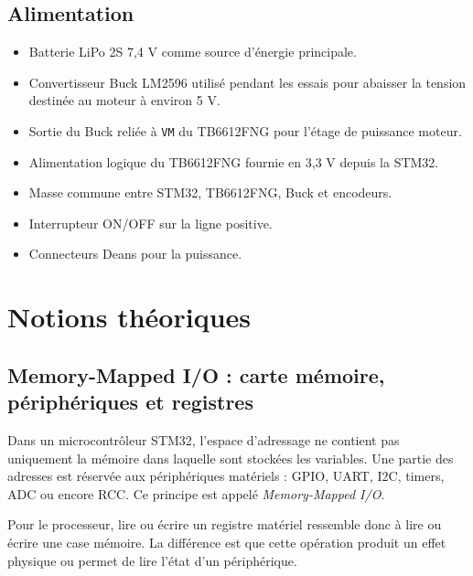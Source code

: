 \documentclass[11pt,a4paper]{article}
\begin{document}
	\subsection*{Alimentation}
	
	\begin{componentbox}
		\begin{itemize}
			\item Batterie LiPo 2S 7,4 V comme source d'énergie principale.
			\item Convertisseur Buck LM2596 utilisé pendant les essais pour abaisser la tension destinée au moteur à environ 5 V.
			\item Sortie du Buck reliée à \texttt{VM} du TB6612FNG pour l'étage de puissance moteur.
			\item Alimentation logique du TB6612FNG fournie en 3,3 V depuis la STM32.
			\item Masse commune entre STM32, TB6612FNG, Buck et encodeurs.
			\item Interrupteur ON/OFF sur la ligne positive.
			\item Connecteurs Deans pour la puissance.
		\end{itemize}
	\end{componentbox}
	
	
	\section{Notions théoriques}
	
	\subsection*{Memory-Mapped I/O : carte mémoire, périphériques et registres}
	
	Dans un microcontrôleur STM32, l'espace d'adressage ne contient pas uniquement la mémoire dans laquelle sont stockées les variables. Une partie des adresses est réservée aux périphériques matériels : GPIO, UART, I2C, timers, ADC ou encore RCC. Ce principe est appelé \textit{Memory-Mapped I/O}.
	
	Pour le processeur, lire ou écrire un registre matériel ressemble donc à lire ou écrire une case mémoire. La différence est que cette opération produit un effet physique ou permet de lire l'état d'un périphérique.
	
\end{document}

